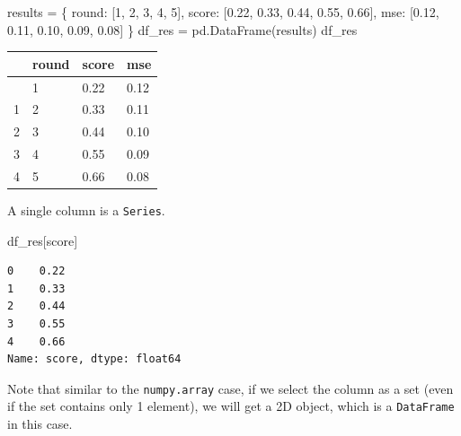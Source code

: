 \documentclass[
  letterpaper,
  DIV=11,
  numbers=noendperiod]{scrreprt}
\newenvironment{Shaded}{\begin{snugshade}}{\end{snugshade}}
\newcommand{\DecValTok}[1]{\textcolor[rgb]{0.68,0.00,0.00}{#1}}
\newcommand{\FloatTok}[1]{\textcolor[rgb]{0.68,0.00,0.00}{#1}}
\newcommand{\NormalTok}[1]{\textcolor[rgb]{0.00,0.23,0.31}{#1}}
\newcommand{\OperatorTok}[1]{\textcolor[rgb]{0.37,0.37,0.37}{#1}}
\newcommand{\StringTok}[1]{\textcolor[rgb]{0.13,0.47,0.30}{#1}}
\newcounter{none} %
\theoremstyle{definition}
\theoremstyle{definition}
\theoremstyle{plain}
\theoremstyle{plain}
\theoremstyle{remark}
\begin{document}
\begin{Shaded}
\begin{Highlighting}[]
\NormalTok{results }\OperatorTok{=}\NormalTok{ \{}
    \StringTok{\textquotesingle{}round\textquotesingle{}}\NormalTok{: [}\DecValTok{1}\NormalTok{, }\DecValTok{2}\NormalTok{, }\DecValTok{3}\NormalTok{, }\DecValTok{4}\NormalTok{, }\DecValTok{5}\NormalTok{],}
    \StringTok{\textquotesingle{}score\textquotesingle{}}\NormalTok{: [}\FloatTok{0.22}\NormalTok{, }\FloatTok{0.33}\NormalTok{, }\FloatTok{0.44}\NormalTok{, }\FloatTok{0.55}\NormalTok{, }\FloatTok{0.66}\NormalTok{], }
    \StringTok{\textquotesingle{}mse\textquotesingle{}}\NormalTok{: [}\FloatTok{0.12}\NormalTok{, }\FloatTok{0.11}\NormalTok{, }\FloatTok{0.10}\NormalTok{, }\FloatTok{0.09}\NormalTok{, }\FloatTok{0.08}\NormalTok{]}
\NormalTok{\}}
\NormalTok{df\_res }\OperatorTok{=}\NormalTok{ pd.DataFrame(results)}
\NormalTok{df\_res}
\end{Highlighting}
\end{Shaded}

{\def\LTcaptype{none} %
\begin{longtable}[]{@{}llll@{}}
\toprule\noalign{}
& round & score & mse \\
\midrule\noalign{}
\endhead
\bottomrule\noalign{}
\endlastfoot
0 & 1 & 0.22 & 0.12 \\
1 & 2 & 0.33 & 0.11 \\
2 & 3 & 0.44 & 0.10 \\
3 & 4 & 0.55 & 0.09 \\
4 & 5 & 0.66 & 0.08 \\
\end{longtable}
}

A single column is a \texttt{Series}.

\begin{Shaded}
\begin{Highlighting}[]
\NormalTok{df\_res[}\StringTok{\textquotesingle{}score\textquotesingle{}}\NormalTok{]}
\end{Highlighting}
\end{Shaded}

\begin{verbatim}
0    0.22
1    0.33
2    0.44
3    0.55
4    0.66
Name: score, dtype: float64
\end{verbatim}

Note that similar to the \texttt{numpy.array} case, if we select the
column as a set (even if the set contains only 1 element), we will get a
2D object, which is a \texttt{DataFrame} in this case.
\end{document}
